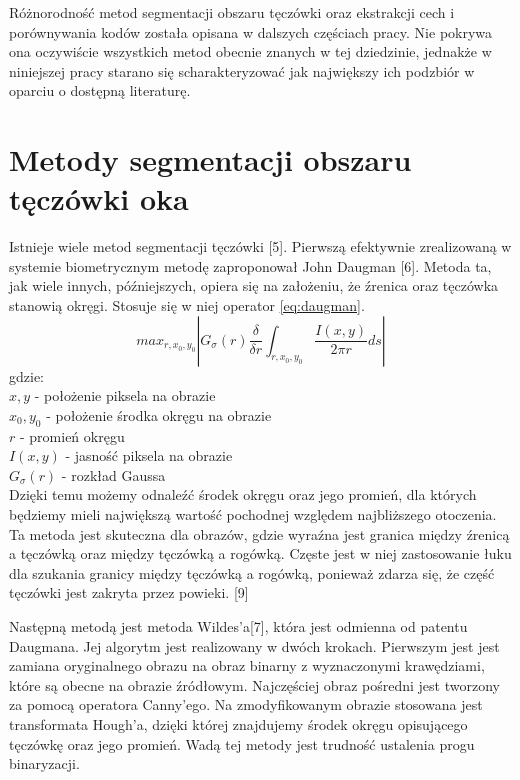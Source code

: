 	Różnorodność metod segmentacji obszaru tęczówki oraz ekstrakcji cech i porównywania kodów została opisana w dalszych częściach pracy. Nie pokrywa ona oczywiście wszystkich metod obecnie znanych w tej dziedzinie, jednakże w niniejszej pracy starano się scharakteryzować jak największy ich podzbiór w oparciu o dostępną literaturę.


\section{Metody segmentacji obszaru tęczówki oka}
\label{sec:segmentacja}

Istnieje wiele metod segmentacji tęczówki [5]. Pierwszą efektywnie zrealizowaną w systemie biometrycznym metodę zaproponował John Daugman [6]. Metoda ta, jak wiele innych, późniejszych, opiera się na założeniu, że źrenica oraz tęczówka stanowią okręgi. Stosuje się w niej operator \ref{eq:daugman}.
\begin{equation}
\label{eq:daugman}
max_{r,x_{0},y_{0}}\left| G_{\sigma}(r) \frac{\delta}{\delta r}\int_{r,x_{0},y_{0}} \frac{I(x,y)}{2\pi r}ds \right|
\end{equation}
gdzie:\\
$ x,y $ - położenie piksela na obrazie \\
$ x_{0}, y_{0} $ - położenie środka okręgu na obrazie \\
$ r $ - promień okręgu \\
$ I(x,y) $ - jasność piksela na obrazie\\
$ G_{\sigma}(r) $ - rozkład Gaussa\\

Dzięki temu możemy odnaleźć środek okręgu oraz jego promień, dla których będziemy mieli największą wartość pochodnej względem najbliższego otoczenia. Ta metoda jest skuteczna dla obrazów, gdzie wyraźna jest granica między źrenicą a tęczówką oraz między tęczówką a rogówką. Częste jest w niej zastosowanie łuku dla szukania granicy między tęczówką a rogówką, ponieważ zdarza się, że część tęczówki jest zakryta przez powieki. [9]

Następną metodą jest metoda Wildes'a[7], która jest odmienna od patentu Daugmana. Jej algorytm jest realizowany w dwóch krokach. Pierwszym jest jest zamiana oryginalnego obrazu na obraz binarny z wyznaczonymi krawędziami, które są obecne na obrazie źródłowym. Najczęściej obraz pośredni jest tworzony za pomocą operatora Canny'ego. Na zmodyfikowanym obrazie stosowana jest transformata Hough'a, dzięki której znajdujemy środek okręgu opisującego tęczówkę oraz jego promień. Wadą tej metody jest trudność ustalenia progu binaryzacji.

